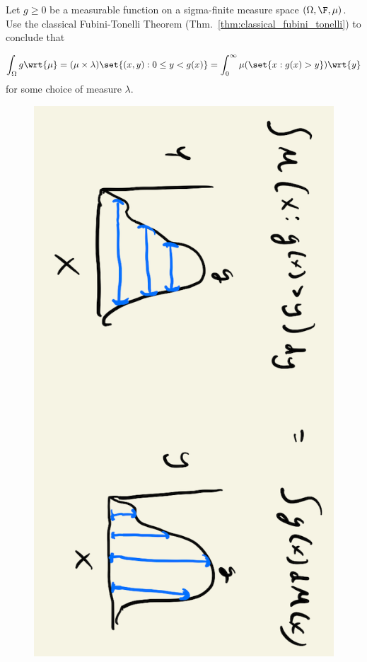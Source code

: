 \documentclass{article} %
\newcommand{\dmu}{\wrt{\mu}}
\begin{document}
\begin{example}{}\;\cite[Exercise~1.7.2]{durrett2010probability}
Let $g \geq 0$ be a measurable function on a sigma-finite measure space $(\Omega, \F, \mu)$. Use the classical Fubini-Tonelli Theorem (Thm.~\ref{thm:classical_fubini_tonelli}) to conclude that

\[  \int_\Omega g \dmu = (\mu \times \lambda)\set{(x,y): 0 \leq y < g(x)} = \int_0^\infty \mu(\set{x : g(x) > y}) \wrt{y} \]
for some choice of measure $\lambda$.

\begin{figure}[H]
\centering
\includegraphics[width=.4\textwidth, angle=90]{images/auc_through_horizontal_or_vertical_sections}	
\end{figure}

\label{ex:area_under_the_curve_via_horizontal_sections}
\end{example}
\end{document}

